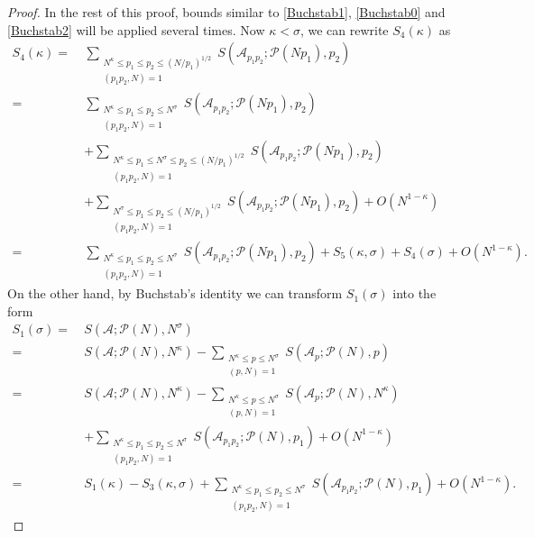 \documentclass[12pt, a4paper]{amsart}
\def\le{\leqslant}
\theoremstyle{plain}
\theoremstyle{remark}
\numberwithin{equation}{section}
\begin{document}
\begin{proof}
In the rest of this proof, bounds similar to \eqref{Buchstab1}, \eqref{Buchstab0} and \eqref{Buchstab2} will be applied 
several times. Now $\kappa<\sigma$, we can rewrite $S_4(\kappa)$ as 
\begin{equation}\label{Goldbachw5}
\begin{split}
S_4(\kappa)
=\ &\sum_{\substack{N^\kappa \le p_1 \le p_2 \le (N/p_1)^{1/2} \\ (p_1 p_2, N) = 1}}  S(\mathscr{A}_{p_1 p_2}; \mathscr{P}(N p_1), p_2)\\ 
=\ &\sum_{\substack{N^\kappa \le p_1 \le p_2 \le N^\sigma \\ (p_1 p_2, N) = 1}}  S(\mathscr{A}_{p_1 p_2}; \mathscr{P}(N p_1), p_2)\\
&+\sum_{\substack{N^\kappa \le p_1 \le N^\sigma\le p_2 \le (N/p_1)^{1/2} \\ (p_1 p_2, N) = 1}}  S(\mathscr{A}_{p_1 p_2}; \mathscr{P}(N p_1), p_2)\\
&+\sum_{\substack{N^\sigma \le p_1 \le p_2 \le (N/p_1)^{1/2} \\ (p_1 p_2, N) = 1}}  S(\mathscr{A}_{p_1 p_2}; \mathscr{P}(N p_1), p_2)+O(N^{1-\kappa})\\
=\ &\sum_{\substack{N^\kappa \le p_1 \le p_2 \le N^\sigma \\ (p_1 p_2, N) = 1}}  S(\mathscr{A}_{p_1 p_2}; \mathscr{P}(N p_1), p_2)+S_5(\kappa,\sigma)+S_4(\sigma)+O(N^{1-\kappa}). 
\end{split}
\end{equation}
On the other hand, by Buchstab's identity we can transform $S_1(\sigma)$ into the form 
\begin{equation}\label{Goldbachw3}
\begin{split}
S_1(\sigma)=\ &S(\mathscr{A};\mathscr{P}(N),N^\sigma)\\
		=\ & S(\mathscr{A};\mathscr{P}(N),N^\kappa)-\sum\limits_{\substack{N^\kappa\le p\le N^{\sigma} \\(p, N)=1}}S(\mathscr{A}_p ; \mathscr{P}(N), p)\\
		=\ & S(\mathscr{A};\mathscr{P}(N),N^\kappa)-\sum\limits_{\substack{N^\kappa\le p\le N^{\sigma} \\(p, N)=1}}S(\mathscr{A}_p ; \mathscr{P}(N), N^\kappa)\\
		& +\sum_{\substack{N^\kappa \le p_1 \le p_2 \le N^\sigma \\ (p_1 p_2, N) = 1}}  S(\mathscr{A}_{p_1 p_2}; \mathscr{P}(N), p_1)+O(N^{1-\kappa})\\
		=\ &S_1(\kappa)-S_3(\kappa,\sigma)+\sum_{\substack{N^\kappa \le p_1 \le p_2 \le N^\sigma \\ (p_1 p_2, N) = 1}}  S(\mathscr{A}_{p_1 p_2}; \mathscr{P}(N), p_1)+O(N^{1-\kappa}). 

\end{split}
\end{equation}
\end{proof}
\end{document}
